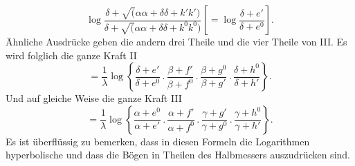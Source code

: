 \[
\log\frac{\delta+\surd(\alpha\alpha+\delta\delta+k'k')}{\delta+\surd(\alpha\alpha+\delta\delta+k^0k^0)}\left[=\log\frac{\delta+e'}{\delta+e^0}\right].
\]
\noindent Ähnliche Ausdrücke geben die andern drei Theile und die vier Theile von III. Es wird folglich die ganze Kraft II
\[
=\frac{1}{\lambda}\log\left\{\frac{\delta+e'}{\delta+e^0}\mathbin{.}\frac{\beta+f'}{\beta+f^0}\mathbin{.}\frac{\beta+g^0}{\beta+g'}\mathbin{.}\frac{\delta+h^0}{\delta+h'}\right\}.
\]
\noindent Und auf gleiche Weise die ganze Kraft III
\[
=\frac{1}{\lambda}\log\left\{\frac{\alpha+e^0}{\alpha+e'}\mathbin{.}\frac{\alpha+f'}{\alpha+f^0}\mathbin{.}\frac{\gamma+g'}{\gamma+g^0}\mathbin{.}\frac{\gamma+h^0}{\gamma+h'}\right\}.
\]
\noindent Es ist überflüssig zu bemerken, dass in diesen Formeln die Logarithmen hyperbolische und dass die Bögen in Theilen des Halbmessers auszudrücken sind.
\clearpage\endgroup
